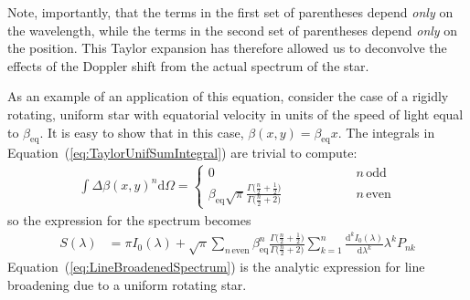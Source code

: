 \documentclass[modern]{aastex62}
\begin{document}
Note, importantly, that the terms in the first set of parentheses depend \emph{only} on the wavelength,
while the terms in the second set of parentheses depend \emph{only} on the position.
This Taylor expansion has therefore allowed us to deconvolve the effects of the Doppler
shift from the actual spectrum of the star.

As an example of an application of this equation, consider the case of a rigidly rotating,
uniform star with equatorial velocity in units of the speed of light equal to $\beta_\mathrm{eq}$. 
It is easy to show that in this case, $\beta(x, y) = \beta_\mathrm{eq} x$. The integrals
in Equation~(\ref{eq:TaylorUnifSumIntegral}) are trivial to compute:
%
\begin{align}
    \int{\Delta\beta(x, y)^n}\mathrm{d}\Omega = 
        \begin{cases} 
            0 & \quad\quad\quad\quad\quad n \, \mathrm{odd} \\
            \beta_\mathrm{eq}\sqrt{\pi}\frac{\Gamma\big(\frac{n}{2} + \frac{1}{2}\big)}{\Gamma\big(\frac{n}{2} + 2\big)} & \quad\quad\quad\quad\quad n \, \mathrm{even}
        \end{cases}
\end{align}
%
so the expression for the spectrum becomes
\begin{align}
    \label{eq:LineBroadenedSpectrum}
    S(\lambda) 
        &=
        \pi I_0(\lambda)
        + 
        \sqrt{\pi}
        \sum_{n\,\mathrm{even}}
            \beta_\mathrm{eq}^n
            \frac{\Gamma\big(\frac{n}{2} + \frac{1}{2}\big)}{\Gamma\big(\frac{n}{2} + 2\big)}
            \sum_{k=1}^n 
                \frac{\mathrm{d}^k I_0(\lambda)}{\mathrm{d}\lambda^k} \lambda^k P_{nk} 
\end{align}
%
Equation~(\ref{eq:LineBroadenedSpectrum}) is the analytic expression for line broadening
due to a uniform rotating star.



\end{document}
